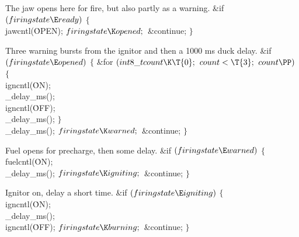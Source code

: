 The jaw opens here for fire, but also partly as a warning.
\Y\B\&{if} ${}(\\{firingstate}\E\\{ready}){}$\5
${}\{{}$\1\6
\\{jawcntl}(\.{OPEN});\6
${}\\{firingstate}\K\\{opened};{}$\6
\&{continue};\6
\4${}\}{}$\2\par
\fi

Three warning bursts from the ignitor and then a 1000 ms duck delay.
\Y\B\&{if} ${}(\\{firingstate}\E\\{opened}){}$\5
${}\{{}$\1\6
\&{for} ${}(\\{int8\_t}\\{count}\K\T{0};{}$ ${}\\{count}<\T{3};{}$ ${}\\{count}%
\PP){}$\5
${}\{{}$\1\6
\\{igncntl}(\.{ON});\6
\\{\_delay\_ms}();\6
\\{igncntl}(\.{OFF});\6
\\{\_delay\_ms}();\6
\4${}\}{}$\2\6
\\{\_delay\_ms}();\6
${}\\{firingstate}\K\\{warned};{}$\6
\&{continue};\6
\4${}\}{}$\2\par
\fi

Fuel opens for precharge, then some delay.
\Y\B\&{if} ${}(\\{firingstate}\E\\{warned}){}$\5
${}\{{}$\1\6
\\{fuelcntl}(\.{ON});\6
\\{\_delay\_ms}();\6
${}\\{firingstate}\K\\{igniting};{}$\6
\&{continue};\6
\4${}\}{}$\2\par
\fi

Ignitor on, delay a short time.
\Y\B\&{if} ${}(\\{firingstate}\E\\{igniting}){}$\5
${}\{{}$\1\6
\\{igncntl}(\.{ON});\6
\\{\_delay\_ms}();\6
\\{igncntl}(\.{OFF});\6
${}\\{firingstate}\K\\{burning};{}$\6
\&{continue};\6
\4${}\}{}$\2\par
\fi

